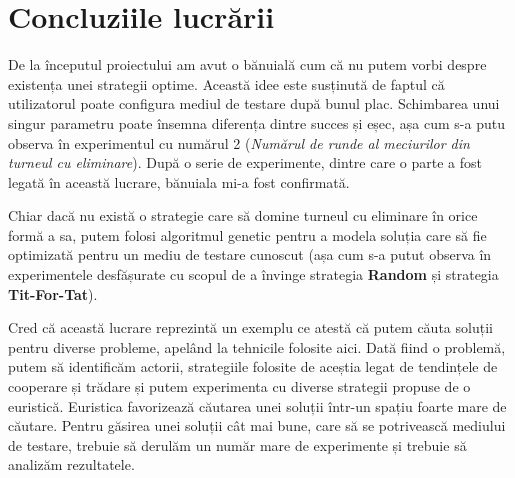 \chapter*{Concluziile lucrării}

De la începutul proiectului am avut o bănuială cum că nu putem vorbi despre existența unei strategii optime. Această idee este susținută de faptul că utilizatorul poate configura mediul de testare după bunul plac. Schimbarea unui singur parametru poate însemna diferența dintre succes și eșec, așa cum s-a putu observa în experimentul cu numărul 2 (\textit{Numărul de runde al meciurilor din turneul cu eliminare}). După o serie de experimente, dintre care o parte a fost legată în această lucrare, bănuiala mi-a fost confirmată.  
 
Chiar dacă nu există o strategie care să domine turneul cu eliminare în orice formă a sa, putem folosi algoritmul genetic pentru a modela soluția care să fie optimizată pentru un mediu de testare cunoscut (așa cum s-a putut observa în experimentele desfășurate cu scopul de a învinge strategia \textbf{Random} și strategia \textbf{Tit-For-Tat}). 
  
Cred că această lucrare reprezintă un exemplu ce atestă că putem căuta soluții pentru diverse probleme, apelând la tehnicile folosite aici. Dată fiind o problemă, putem să identificăm actorii, strategiile folosite de aceștia legat de tendințele de cooperare și trădare și putem experimenta cu diverse strategii propuse de o euristică. Euristica favorizează căutarea unei soluții într-un spațiu foarte mare de căutare. Pentru găsirea unei soluții cât mai bune, care să se potrivească mediului de testare, trebuie să derulăm un număr mare de experimente și trebuie să analizăm rezultatele. 

\clearpage